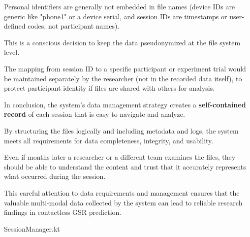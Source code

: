 Personal identifiers are generally not embedded in file names (device IDs are generic like "phone1" or a device serial, and session IDs are timestamps or user-defined codes, not participant names).

This is a conscious decision to keep the data pseudonymized at the file system level.

The mapping from session ID to a specific participant or experiment trial would be maintained separately by the researcher (not in the recorded data itself), to protect participant identity if files are shared with others for analysis.

In conclusion, the system's data management strategy creates a \textbf{self-contained record}
 of each session that is easy to navigate and analyze.

By structuring the files logically and including metadata and logs, the system meets all requirements for data completeness, integrity, and usability.

Even if months later a researcher or a different team examines the files, they should be able to understand the content and trust that it accurately represents what occurred during the session.

This careful attention to data requirements and management ensures that the valuable multi-modal data collected by the system can lead to reliable research findings in contactless GSR prediction.

SessionManager.kt
